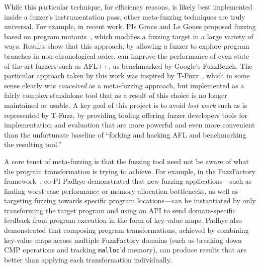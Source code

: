While this particular technique, for efficiency reasons, is likely best 
implemented inside a fuzzer's instrumentation pass, other meta-fuzzing 
techniques are truly universal.  For example, in recent work, PIs Groce and Le Goues 
proposed fuzzing based on program mutants~\cite{fuzzing22}, which modifies a fuzzing 
target in a large variety of ways.  Results show that this approach, by 
allowing a fuzzer to explore program branches in non-chronological order, can 
improve the performance of even state-of-the-art fuzzers such as AFL++, 
as benchmarked by Google's FuzzBench.  The particular approach taken
by this work was inspired by T-Fuzz~\cite{tfuzz}, which in some sense
clearly was \emph{conceived} as a meta-fuzzing approach, but implemented as a
fairly complex standalone
tool that as a result of this choice is no longer maintained or usable.  A key
goal of this project is to avoid \emph{lost work} such as is
represented by T-Fuzz, by providing tooling offering fuzzer developers
tools for implementation and evaluation that are more powerful and
even more convenient than the unfortunate baseline of ``forking and hacking AFL and benchmarking
the resulting tool.''

A core tenet of meta-fuzzing is that the fuzzing tool need not be aware of what 
the program transformation is trying to achieve. For example, in the 
FuzzFactory framework~\cite{fuzzfactory}, co-PI Padhye demonstrated that new 
fuzzing applications---such as finding worst-case performance or 
memory-allocation bottlenecks, as well as targeting fuzzing towards specific 
program locations---can be instantiated by only transforming the target program 
and using an API to send domain-specific feedback from program execution in the 
form of key-value maps. Padhye also demonstrated that composing program 
transformations, achieved by combining key-value maps across multiple 
FuzzFactory domains (such as breaking down CMP operations and tracking 
\texttt{malloc}'d memory), can produce results that are better than applying 
each transformation individually.


